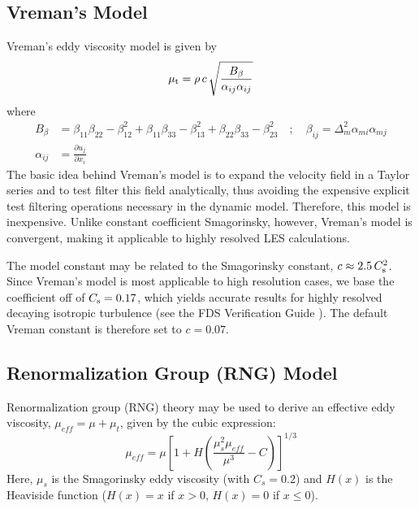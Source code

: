 \subsection{Vreman's Model}
\label{sec:vreman}

Vreman's eddy viscosity model \cite{vreman:2004} is given by
\begin{equation}
\label{eqn_mu_vreman}
\mu_{\rm t} = \rho \, c \, \sqrt{ \frac{B_\beta}{\alpha_{ij}\alpha_{ij}} }
\end{equation}
where
\begin{align}
B_\beta     &= \beta_{11}\beta_{22} - \beta_{12}^2 + \beta_{11}\beta_{33} - \beta_{13}^2 + \beta_{22}\beta_{33} - \beta_{23}^2 \quad ; \quad \beta_{ij} = \Delta_m^2 \alpha_{mi} \alpha_{mj} \\
\alpha_{ij} &= \frac{\partial u_j}{\partial x_i}
\end{align}
The basic idea behind Vreman's model is to expand the velocity field in a Taylor series and to test filter this field analytically, thus avoiding the expensive explicit test filtering operations necessary in the dynamic model.  Therefore, this model is inexpensive.  Unlike constant coefficient Smagorinsky, however, Vreman's model is convergent, making it applicable to highly resolved LES calculations.

The model constant may be related to the Smagorinsky constant, $c \approx 2.5 \, C_{\rm s}^2$.  Since Vreman's model is most applicable to high resolution cases, we base the coefficient off of $C_{\rm s} = 0.17$, which yields accurate results for highly resolved decaying isotropic turbulence (see the FDS Verification Guide \cite{FDS_Verification_Guide}).  The default Vreman constant is therefore set to $c = 0.07$.

\subsection{Renormalization Group (RNG) Model}
\label{sec:rng}

Renormalization group (RNG) theory \cite{Yakhot:1989} may be used to derive an effective eddy viscosity, $\mu_{\si{eff}} = \mu + \mu_t$, given by the cubic expression:
\begin{equation}
\label{eq:rng}
\mu_{\si{eff}} = \mu\left[1 + H\left( \frac{\mu_s^2 \mu_{\si{eff}}}{\mu^3} - C \right)\right]^{1/3}
\end{equation}
Here, $\mu_s$ is the Smagorinsky eddy viscosity (with $C_s=0.2$) and $H(x)$ is the Heaviside function ($H(x)=x$ if $x>0$, $H(x)=0$ if $x\le0$).

